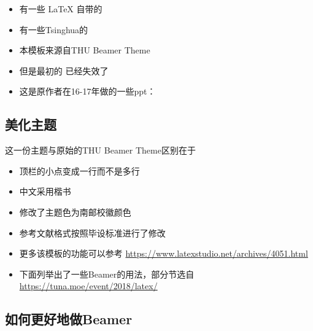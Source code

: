 \documentclass{beamer}
\begin{document}
\begin{frame}
    \begin{itemize}
        \item 有一些 \LaTeX{} 自带的
        \item 有一些Tsinghua的
        \item 本模板来源自THU Beamer Theme
        \item 但是最初的 \href{http://far.tooold.cn/post/latex/beamertsinghua}{\color{purple}{link}} \cite{origin}已经失效了
        \item 这是原作者在16-17年做的一些ppt：\href{https://github.com/Trinkle23897/oi_slides}{\color{blue}{戳我}}
    \end{itemize}
\end{frame}

\subsection{美化主题}

\begin{frame}{这一份主题与原始的THU Beamer Theme区别在于}
    \begin{itemize}
        \item 顶栏的小点变成一行而不是多行
        \item 中文采用楷书
        \item 修改了主题色为南邮校徽颜色
        \item 参考文献格式按照毕设标准进行了修改
        \item 更多该模板的功能可以参考 \url{https://www.latexstudio.net/archives/4051.html}
        \item 下面列举出了一些Beamer的用法，部分节选自 \url{https://tuna.moe/event/2018/latex/}
    \end{itemize}
\end{frame}

\subsection{如何更好地做Beamer}
\end{document}
